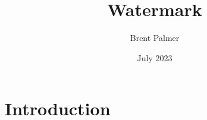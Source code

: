 \documentclass{article}
\title{Watermark}
\author{Brent Palmer}
\date{July 2023}
\begin{document}
\maketitle

\section{Introduction}

\lipsum[1-20]
\end{document}
